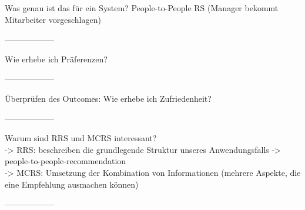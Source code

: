 Was genau ist das für ein System? People-to-People RS (Manager bekommt Mitarbeiter vorgeschlagen)

------------------

Wie erhebe ich Präferenzen? %

------------------

Überprüfen des Outcomes:
Wie erhebe ich Zufriedenheit? %

------------------

Warum sind RRS und MCRS interessant?\\
-> RRS: beschreiben die grundlegende Struktur unseres Anwendungsfalls -> people-to-people-recommendation\\
-> MCRS: Umsetzung der Kombination von Informationen (mehrere Aspekte, die eine Empfehlung ausmachen können)

------------------

